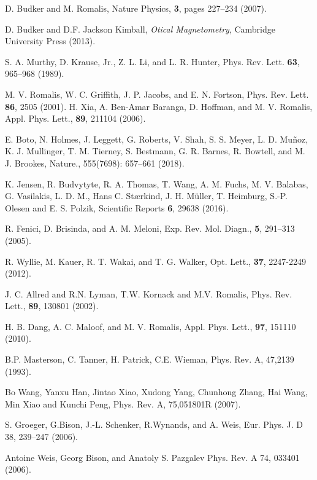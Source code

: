 \documentclass[%
reprint,
 amsmath,amssymb,
 aps,
floatfix,
]{revtex4-1}
\begin{document}
\newpage

\begin{thebibliography}{41}%
D. Budker and M. Romalis, Nature Physics, {\bf 3}, pages 227–234 (2007).

D. Budker and D.F. Jackson Kimball, {\it Otical Magnetometry}, Cambridge University Press (2013).

S. A. Murthy, D. Krause, Jr., Z. L. Li, and L. R. Hunter, Phys. Rev. Lett. {\bf 63}, 965–968 (1989).

M. V. Romalis, W. C. Griffith, J. P. Jacobs, and E. N. Fortson, Phys. Rev. Lett. {\bf 86}, 2505 (2001).
H. Xia, A. Ben-Amar Baranga, D. Hoffman, and M. V. Romalis, Appl. Phys. Lett., {\bf 89}, 211104 (2006).

E. Boto, N. Holmes, J. Leggett, G. Roberts, V. Shah, S. S. Meyer, L. D. Muñoz, K. J. Mullinger, T. M. Tierney, S. Bestmann, G. R. Barnes, R. Bowtell, and M. J. Brookes, Nature., 555(7698): 657–661 (2018).

K. Jensen, R. Budvytyte, R. A. Thomas, T. Wang, A. M. Fuchs, M. V. Balabas, G. Vasilakis, L. D. M., Hans C. Stærkind, J. H. Müller, T. Heimburg, S.-P. Olesen and E. S. Polzik, Scientific Reports {\bf 6}, 29638 (2016).

R. Fenici, D. Brisinda, and A. M. Meloni, Exp. Rev. Mol. Diagn., {\bf 5}, 291–313 (2005).

R. Wyllie, M. Kauer, R. T. Wakai, and T. G. Walker, Opt. Lett., {\bf 37}, 2247-2249 (2012).

J. C. Allred and R.N. Lyman, T.W. Kornack and M.V. Romalis,
Phys. Rev. Lett., {\bf 89}, 130801 (2002).

H. B. Dang, A. C. Maloof, and M. V. Romalis,
Appl. Phys. Lett., {\bf 97}, 151110 (2010).


B.P. Masterson, C. Tanner, H. Patrick, C.E. Wieman,
Phys. Rev. A, 47,2139 (1993).

Bo Wang, Yanxu Han, Jintao Xiao, Xudong Yang, Chunhong Zhang, Hai Wang, Min Xiao and Kunchi Peng,
Phys. Rev. A, 75,051801R (2007).

S. Groeger, G.Bison, J.-L. Schenker, R.Wynands, and A. Weis,
Eur. Phys. J. D 38, 239–247 (2006).

Antoine Weis, Georg Bison, and Anatoly S. Pazgalev
Phys. Rev. A 74, 033401 (2006).


\end{thebibliography}
\end{document}
